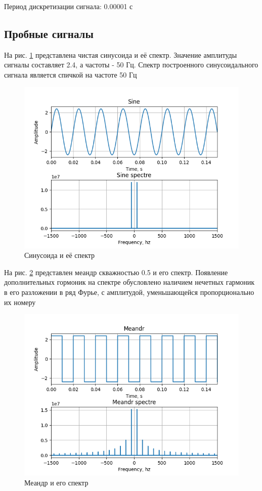 Период дискретизации сигнала: 0.00001 с

\subsection{Пробные сигналы}

На рис. \ref{fig:7} представлена чистая синусоида и её спектр. Значение амплитуды сигналы
составляет 2.4, а частоты - 50 Гц. Спектр построенного синусоидального сигнала является
спичкой на частоте 50 Гц

\begin{figure}[H]
	\centering
	\includegraphics[width=0.7\linewidth]{body/images/sine-and-its-spectre.png}
	\caption{Синусоида и её спектр}
	\label{fig:7}
\end{figure}

На рис. \ref{fig:8} представлен меандр скважностью 0.5 и его спектр.
Появление дополнительных гормоник на спектре обусловлено наличием нечетных гармоник в его
разложении в ряд Фурье, с амплитудой, уменьшающейся пропорционально их номеру

\begin{figure}[H]
	\centering
	\includegraphics[width=0.7\linewidth]{body/images/meandr-and-its-spectre.png}
	\caption{Меандр и его спектр}
	\label{fig:8}
\end{figure}

